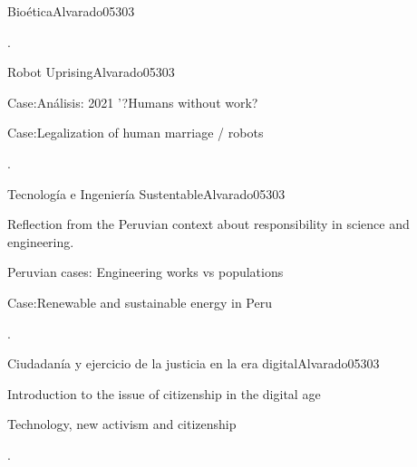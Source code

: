 \begin{syllabus}
\begin{unit}{}{Bioética}{Alvarado05}{30}{3}
   \begin{learningoutcomes}
      \item . 
   \end{learningoutcomes}
\end{unit}

\begin{unit}{}{Robot Uprising}{Alvarado05}{30}{3}
   \begin{topics}
      \item  Case:Análisis: 2021 '?Humans without work?
      \item  Case:Legalization of human marriage / robots
   \end{topics}

   \begin{learningoutcomes}
      \item .
   \end{learningoutcomes}
\end{unit}

\begin{unit}{}{ Tecnología e Ingeniería Sustentable}{Alvarado05}{30}{3}
   \begin{topics}
      \item Reflection from the Peruvian context about responsibility in science and engineering.
      \item Peruvian cases: Engineering works vs populations
      \item Case:Renewable and sustainable energy in Peru
   \end{topics}

   \begin{learningoutcomes}
      \item . 
   \end{learningoutcomes}
\end{unit}

\begin{unit}{}{ Ciudadanía y ejercicio de la justicia en la era digital}{Alvarado05}{30}{3}
   \begin{topics}
      \item Introduction to the issue of citizenship in the digital age
      \item Technology, new activism and citizenship
   \end{topics}

   \begin{learningoutcomes}
      \item .
   \end{learningoutcomes}
\end{unit}


\end{syllabus}
